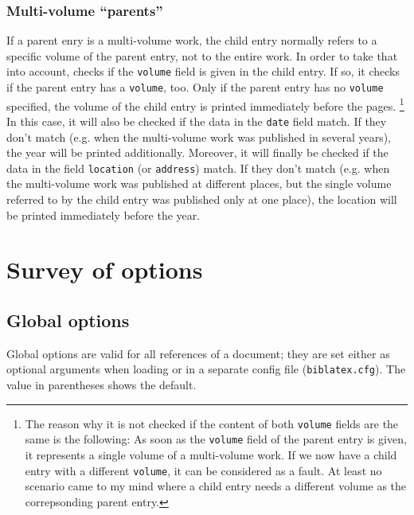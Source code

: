 \documentclass[english]{scrartcl}
\begin{document}
\subsubsection{Multi-volume \enquote{parents}}
If a parent enry is a multi-volume work, the child entry normally refers to
a specific volume of the parent entry, not to the entire work. In order to
take that into account, \bldw{} checks if the \texttt{volume} field is given
in the child entry. If so, it checks if the parent entry has a \texttt{volume},
too. Only if the parent entry has no \texttt{volume} specified, the volume of
the child entry is printed immediately before the pages.%
\footnote{The reason why it is not checked if the content of both \texttt{volume}
fields are the same is the following: As soon as the \texttt{volume} field of 
the parent entry is given, it represents a single volume of a multi-volume work.
If we now have a child entry with a different \texttt{volume}, it can be considered
as a fault. At least no scenario came to my mind where a child entry needs a different
volume as the correpsonding parent entry.} In this case, it will also be checked
if the data in the \texttt{date} field match. If they don't match (e.g. when the
multi-volume work was published in several years), the year will be printed
additionally. Moreover, it will finally be checked if the data in the field
\texttt{location} (or \texttt{address}) match. If they don't match (e.g. when the
multi-volume work was published at different places, but the single volume referred to
by the child entry was published only at one place), the location will be printed
immediately before the year.

\section{Survey of options}
\subsection{Global options}
Global options are valid for all references of a document; they are set
either as optional arguments when loading \bl{} or in a separate config
file (\texttt{biblatex.cfg}). The value in parentheses shows the default.
\end{document}
